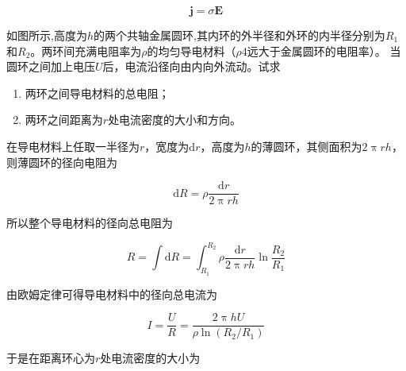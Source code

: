 \documentclass[
	12pt, %
	a4paper, %
]{myLegrandOrangeBook}
\newcommand{\rmd}{\mathrm{d}}
\begin{document}
\begin{equation}
    \mathbf{j} = \sigma \mathbf{E}
\end{equation}

\begin{exercise}
如图所示,高度为\(h\)的两个共轴金属圆环,其内环的外半径和外环的内半径分别为\(R_1\)和\(R_2\)。两环间充满电阻率为\(\rho\)的均匀导电材料（$\rho$4远大于金属圆环的电阻率）。
当圆环之间加上电压\(U\)后，电流沿径向由内向外流动。试求

\begin{enumerate}
    \item 两环之间导电材料的总电阻；
    \item 两环之间距离为\(r\)处电流密度的大小和方向。
\end{enumerate}

\end{exercise}

在导电材料上任取一半径为$r$，宽度为$\rmd r$，高度为$h$的薄圆环，其侧面积为$2 \uppi r h$，则薄圆环的径向电阻为

\begin{equation*}
    \rmd R = \rho \frac{\rmd r}{2 \uppi rh}
\end{equation*}

所以整个导电材料的径向总电阻为

\begin{equation*}
    R = \int \rmd R = \int_{R_1}^{R_2} \rho \frac{\rmd r}{2 \uppi rh} \ln \frac{R_2}{R_1}
\end{equation*}

由欧姆定律可得导电材料中的径向总电流为

\begin{equation*}
    I = \frac{U}{R} = \frac{2 \uppi h U}{\rho \ln(R_2/R_1)}
\end{equation*}

于是在距离环心为\(r\)处电流密度的大小为
\end{document}
